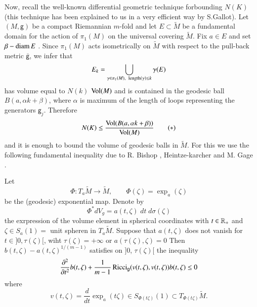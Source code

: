 Now, recall the well-known differential geometric technique for\break bounding $N(K)$ (this technique has been explained to us in a very efficient way by S.Gallot). Let $(M, \mathsf{g})$ be a compact Riemannian $m$-fold and let $E\subset \widetilde{M}$ be a fundamental domain for the action of $\pi_{1}(M)$ on the universal covering $\widetilde{M}$. Fix $a\in E$ and set $\beta - \operatorname{diam} E$ . Since $\pi_{1}(M)$ acts isometrically on $\widetilde{M}$ with respect to the pull-back metric $\overline{\mathsf{g}}$, we infer that
$$
E_{k} = \bigcup\limits_{\gamma\in \pi_{1}(M),\;\; \operatorname{length}(\gamma)\leq k} \gamma(E)
$$
has volume equal to $N(k)$ $\operatorname{Vol}(M)$ and is contained in the geodesic ball $B(a, \alpha k + \beta)$, where $\alpha$ is maximum of the length of loops representing the generators $\mathsf{g}_{j}$. Therefore
\begin{equation*}
N(K) \leq \dfrac{\operatorname{Vol}(B(a, \alpha k + \beta))}{\operatorname{Vol}(M)} \tag{$\ast$}\label{eq:sample2}
\end{equation*}
and it is enough to bound the volume of geodesic balls in $\widetilde{M}$. For this we use the following fundamental inequality due to R. Bishop \cite{art5-keyBi63}, Heintze-karcher \cite{art5-keyHK78} and M. Gage \cite{art5-keyGa80}.

\begin{lem}
Let
$$
\Phi : T_{a}\widetilde{M} \rightarrow \widetilde{M},\qquad \Phi(\zeta)= \exp_{a}(\zeta)
$$
be the (geodesic) exponential map. Denote by
$$
\Phi^{*}dV_{g}= a(t, \zeta)\; dt\; d\sigma(\zeta)
$$
the exrpression of the volume element in spherical coordinates with $t \in \mathbb{R}_{+}$ and $\zeta \in S_{a}(1) =$ unit spheren in $T_{a}\widetilde{M}$. Suppose that $a(t, \zeta)$ does not vanish for $t \in ]0, \tau (\zeta)[$, wiht $\tau(\zeta) = + \infty$ or $a(\tau(\zeta), \zeta) = 0$ Then $b(t, \zeta) - a(t, \zeta)^{1/(m-1)}$ satisfies on $]0$, $\tau(\zeta)[$ the inequality
$$
\dfrac{\partial^{2}}{\partial t^{2}}b(t, \zeta) + \dfrac{1}{m-1}\operatorname{Ricci}_{\mathsf{g}}(v(t, \zeta), v(t, \zeta))b(t, \zeta)\leq 0
$$
where
$$
v(t, \zeta) = \dfrac{d}{dt}\exp_{a}(t\zeta)\in S_{\Phi(t\zeta)}(1) \subset T_{\Phi (t\zeta)}\widetilde{M}.
$$
\end{lem}

